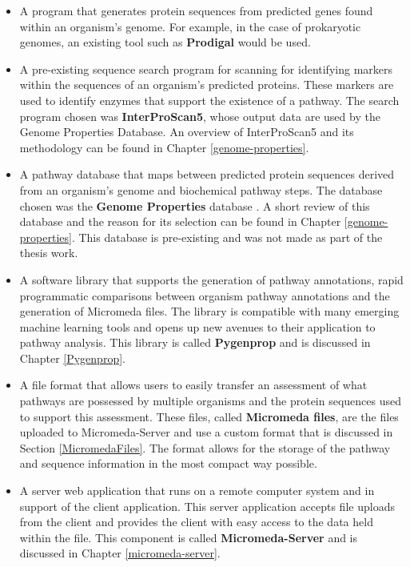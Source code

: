 \begin{itemize}
\item A program that generates protein sequences from predicted genes found 
within an organism's genome. For example, in the case of prokaryotic genomes, an 
existing tool such as \textbf{Prodigal} \cite{hyatt2010prodigal} would be used. 

\item A pre-existing sequence search program for scanning for identifying 
markers within the sequences of an organism's predicted proteins. These markers 
are used to identify enzymes that support the existence of a pathway. The search 
program chosen was \textbf{InterProScan5}, whose output data are used by the 
Genome Properties Database. An overview of InterProScan5 
\cite{jones2014interproscan} and its methodology can be found in Chapter 
\ref{genome-properties}.

\item A pathway database that maps between predicted protein sequences derived 
from an organism's genome and biochemical pathway steps. The database chosen was 
the \textbf{Genome Properties} database \cite{richardson2018genome}. A short 
review of this database and the reason for its selection can be found in Chapter 
\ref{genome-properties}. This database is pre-existing and was not made as part 
of the thesis work.

\item A software library that supports the generation of pathway annotations, 
rapid programmatic comparisons between organism pathway annotations and the 
generation of Micromeda files. The library is compatible with many 
emerging machine learning tools and opens up new avenues to their application to 
pathway analysis. This library is called \textbf{Pygenprop} and is discussed in 
Chapter \ref{Pygenprop}.

\item A file format that allows users to easily transfer an assessment of what 
pathways are possessed by multiple organisms and the protein sequences used to 
support this assessment. These files, called \textbf{Micromeda files}, are the 
files uploaded to Micromeda-Server and use a custom format that is discussed in 
Section \ref{MicromedaFiles}. The format allows for the storage of the pathway 
and sequence information in the most compact way possible.

\item A server web application that runs on a remote computer system and in 
support of the client application. This server application accepts file uploads 
from the client and provides the client with easy access to the data held within 
the file. This component is called \textbf{Micromeda-Server} and is discussed in 
Chapter \ref{micromeda-server}.


\end{itemize}
